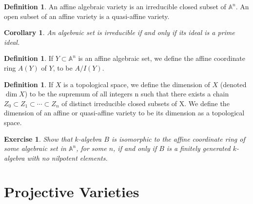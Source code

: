 \documentclass[11pt]{book}
\newtheorem{corollary}[theorem]{Corollary}
\newtheorem{exercise}{Exercise}[section]
\theoremstyle{definition}
\newtheorem{definition}[theorem]{Definition}
\numberwithin{equation}{section}
\begin{document}
\begin{defbox}
    \begin{definition}
        \label{def:algebraic_variety}
        An affine algebraic variety is an irreducible closed subset of \(\mathbb{A}^n\). An open subset of an affine variety is a quasi-affine variety.
    \end{definition}
\end{defbox}

\begin{thmbox}
\begin{corollary}
    \label{cor:ideal_correspondence}
    An algebraic set is irreducible if and only if its ideal is a prime ideal.
\end{corollary}
\end{thmbox}

\begin{defbox}
    \begin{definition}
        \label{def:affine_coordinate_ring}
        If \(Y \subset \mathbb{A}^n\) is an affine algebraic set, we define the affine coordinate ring \(A(Y)\) of \(Y\), to be \(A / I(Y)\). 
    \end{definition}
\end{defbox}

\begin{defbox}
    \begin{definition}
        \label{def:dimension_topological_space}
        If \(X\) is a topological space, we define the dimension of \(X\) (denoted
        \(\dim  X\)) to be the supremum of all integers n such that there exists a chain \(Z_0 \subset Z_1 \subset \cdots \subset Z_n\) of distinct irreducible closed subsets of X. We define the dimension of an affine or quasi-affine variety to be its dimension as a topological space. 
    \end{definition}
\end{defbox}



\begin{exercise}
Show that \(k\)-algebra \(B\) is isomorphic to the affine coordinate ring of some algebraic set in \(\mathbb{A}^n\), for some \(n\), if and only if \(B\) is a finitely generated \(k\)-algebra with no nilpotent elements.
\end{exercise}

\chapter{Projective Varieties}
\end{document}
